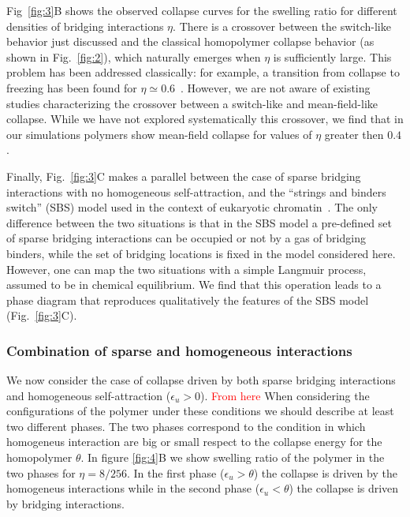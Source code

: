 \documentclass[
preprint,
a4paper,
12pt,
superscriptaddress,
pre]{revtex4}
\newcommand{\rev}[1]{\textcolor{red}{#1}}
\begin{document}
%
Fig~\ref{fig:3}B shows the observed collapse curves for the swelling
ratio for different densities of bridging interactions $\eta$. There
is a crossover between the switch-like behavior just discussed and the
classical homopolymer collapse behavior (as shown in
Fig.~\ref{fig:2}), which naturally emerges when $\eta$ is sufficiently
large. This problem has been addressed classically: for example, a
transition from collapse to freezing has been found for $\eta \simeq
0.6$~\cite{Camacho1997}. However, we are not aware of existing studies
characterizing the crossover between a switch-like and mean-field-like
collapse. While we have not explored systematically this crossover, we
find that in our simulations polymers show mean-field collapse for
values of $\eta$ greater then $0.4$.
%
%



Finally, Fig.~\ref{fig:3}C makes a parallel between the case of
sparse bridging interactions with no homogeneous self-attraction, and
the ``strings and binders switch'' (SBS) model used in the context of
eukaryotic chromatin~\cite{Barbieri2012,Barbieri2013b}.
The only difference between the two situations is that in the SBS
model a pre-defined set of sparse bridging interactions can be
occupied or not by a gas of bridging binders, while the set of
bridging locations is fixed in the model considered here. However, one
can map the two situations with a simple Langmuir process, assumed to
be in chemical equilibrium. We find that this operation leads to a
phase diagram that reproduces qualitatively the features of the SBS
model (Fig.~\ref{fig:3}C).



\subsubsection*{Combination of sparse and homogeneous interactions} 

We now consider the case of collapse driven by both sparse bridging
interactions and homogeneous self-attraction ($\epsilon_u >
0$). 
\rev{From here}
When considering the configurations of the polymer under these
conditions we should describe at least two different phases. The two
phases correspond to the condition in which homogeneus interaction are
big or small respect to the collapse energy for the
homopolymer $\theta$. In figure \ref{fig:4}B we show swelling ratio of
the polymer in the two phases for $\eta = 8/256$. In the first phase
($\epsilon_u > \theta$) the collapse is driven by the homogeneus
interactions while in the second phase ($\epsilon_u < \theta$) the
collapse is driven by bridging interactions.
\end{document}
